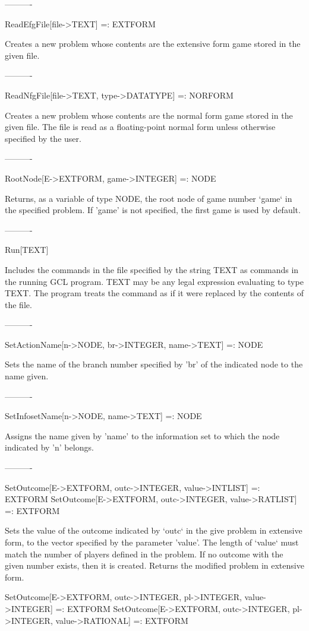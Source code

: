 ----------

ReadEfgFile[file->TEXT] =: EXTFORM

	Creates a new problem whose contents are the extensive form game
stored in the given file.

----------

ReadNfgFile[file->TEXT, {type->DATATYPE}] =: NORFORM

	Creates a new problem whose contents are the normal form game stored
in the given file.  The file is read as a floating-point normal form unless
otherwise specified by the user.

----------

RootNode[E->EXTFORM, {game->INTEGER}] =: NODE

	Returns, as a variable of type NODE, the root node of game number 
`game` in the specified problem.  If 'game' is not specified, the first game is
used by default.

----------

Run[TEXT]

	Includes the commands in the file specified by the string TEXT as
commands in the running GCL program.  TEXT may be any legal expression
evaluating to type TEXT.  The program treats the command as if it were
replaced by the contents of the file.

----------

SetActionName[n->NODE, br->INTEGER, name->TEXT] =: NODE

	Sets the name of the branch number specified by 'br' of the indicated 
node to the name given.

----------

SetInfosetName[n->NODE, name->TEXT] =: NODE

	Assigns the name given by 'name' to the information set to which the 
node indicated by 'n' belongs.

----------

SetOutcome[E->EXTFORM, outc->INTEGER, value->INTLIST] =: EXTFORM
SetOutcome[E->EXTFORM, outc->INTEGER, value->RATLIST] =: EXTFORM

	Sets the value of the outcome indicated by `outc` in the give problem 
in extensive form, to the vector specified by the parameter 'value'.  The 
length of `value` must match the number of players defined in the problem.  If
no outcome with the given number exists, then it is created.  Returns the 
modified problem in extensive form.


SetOutcome[E->EXTFORM, outc->INTEGER, pl->INTEGER, value->INTEGER] =: EXTFORM
SetOutcome[E->EXTFORM, outc->INTEGER, pl->INTEGER, value->RATIONAL] =: EXTFORM

